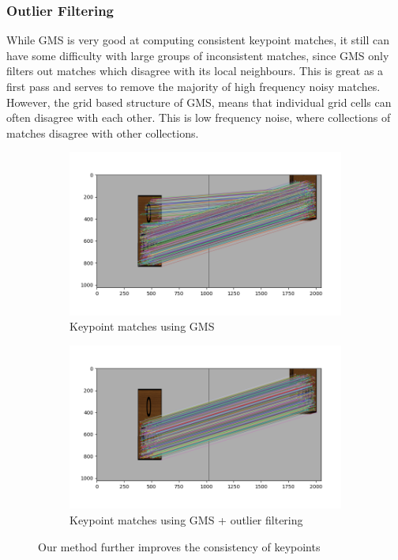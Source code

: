 \subsubsection{Outlier Filtering}
While GMS is very good at computing consistent keypoint matches, it still can have some difficulty with large groups of inconsistent matches, since GMS only filters out matches which disagree with its local neighbours. This is great as a first pass and serves to remove the majority of high frequency noisy matches. However, the grid based structure of GMS, means that individual grid cells can often disagree with each other. This is low frequency noise, where collections of matches disagree with other collections.\\

\begin{figure}[h]
    \centering
    \begin{subfigure}[t]{0.49\textwidth}
        \includegraphics[width=\textwidth]{figures/outliers-gms.png}
        \caption{Keypoint matches using GMS}
        \label{fig:outliers-gms}
    \end{subfigure}
    \hfill
    \begin{subfigure}[t]{0.49\textwidth}
        \includegraphics[width=\textwidth]{figures/outliers-gms+ours.png}
        \caption{Keypoint matches using GMS + outlier filtering}
        \label{fig:outliers-gms+filter}
    \end{subfigure}
    \caption{Our method further improves the consistency of keypoints}
    \label{fig:consensus-filtering}
\end{figure}

